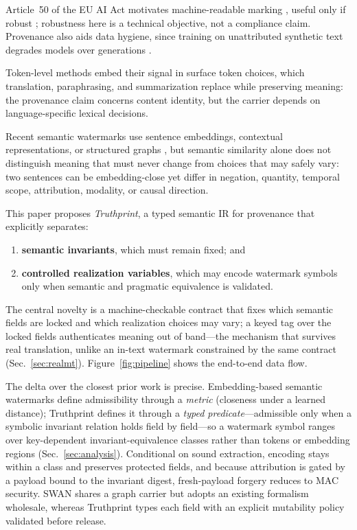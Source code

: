 \documentclass[journal]{IEEEtran}
\begin{document}
Article~50 of the EU AI Act motivates machine-readable marking \cite{euaiact2024}, useful only if robust \cite{liu2024survey}; robustness here is a technical objective, not a compliance claim. Provenance also aids data hygiene, since training on unattributed synthetic text degrades models over generations \cite{shumailov2024collapse}.

Token-level methods embed their signal in surface token choices, which translation, paraphrasing, and summarization replace while preserving meaning: the provenance claim concerns content identity, but the carrier depends on language-specific lexical decisions.

Recent semantic watermarks use sentence embeddings, contextual representations, or structured graphs \cite{hou2024semstamp,ren2024semmark,liu2023sir,ye2026swan,schaefer2026dew}, but semantic similarity alone does not distinguish meaning that must never change from choices that may safely vary: two sentences can be embedding-close yet differ in negation, quantity, temporal scope, attribution, modality, or causal direction.

This paper proposes \emph{Truthprint}, a typed semantic IR for provenance that explicitly separates:
\begin{enumerate}[leftmargin=*]
  \item \textbf{semantic invariants}, which must remain fixed; and
  \item \textbf{controlled realization variables}, which may encode watermark symbols only when semantic and pragmatic equivalence is validated.
\end{enumerate}

The central novelty is a machine-checkable contract that fixes which semantic fields are locked and which realization choices may vary; a keyed tag over the locked fields authenticates meaning out of band---the mechanism that survives real translation, unlike an in-text watermark constrained by the same contract (Sec.~\ref{sec:realmt}). Figure~\ref{fig:pipeline} shows the end-to-end data flow.

The delta over the closest prior work is precise. Embedding-based semantic watermarks \cite{hou2024semstamp,ren2024semmark,liu2023sir,schaefer2026dew} define admissibility through a \emph{metric} (closeness under a learned distance); Truthprint defines it through a \emph{typed predicate}---admissible only when a symbolic invariant relation holds field by field---so a watermark symbol ranges over key-dependent invariant-equivalence classes rather than tokens or embedding regions (Sec.~\ref{sec:analysis}). Conditional on sound extraction, encoding stays within a class and preserves protected fields, and because attribution is gated by a payload bound to the invariant digest, fresh-payload forgery reduces to MAC security. SWAN \cite{ye2026swan} shares a graph carrier but adopts an existing formalism wholesale, whereas Truthprint types each field with an explicit mutability policy validated before release.
\end{document}
